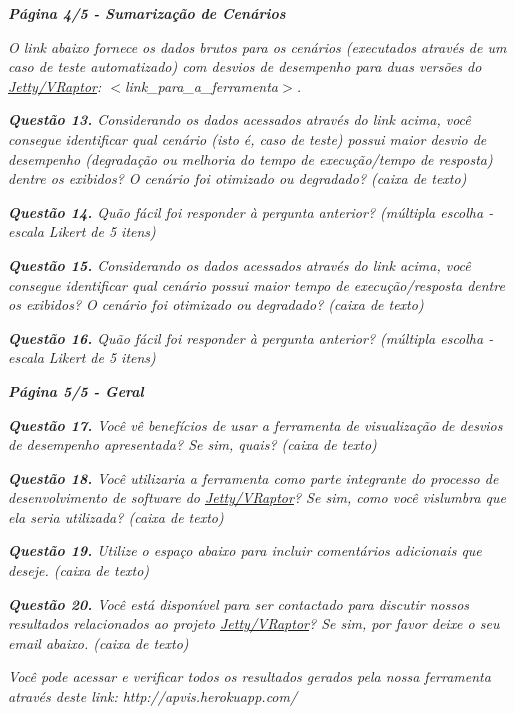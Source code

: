 \begin{framed}
	\noindent \textit{\textbf{Página 4/5 - Sumarização de Cenários}}
	\par
	\noindent \textit{O link abaixo fornece os dados brutos para os cenários (executados através de um caso de teste automatizado) com desvios de desempenho para duas versões do \underline{Jetty/VRaptor}: {\(<\)}link\_para\_a\_ferramenta{\(>\)}.}
	\par
	\noindent \textit{\textbf{Questão 13.} Considerando os dados acessados através do link acima, você consegue identificar qual cenário (isto é, caso de teste) possui maior desvio de desempenho (degradação ou melhoria do tempo de execução/tempo de resposta) dentre os exibidos? O cenário foi otimizado ou degradado? (caixa de texto)}
	\par
	\noindent \textit{\textbf{Questão 14.} Quão fácil foi responder à pergunta anterior? (múltipla escolha - escala Likert de 5 itens)}
	\par
	\noindent \textit{\textbf{Questão 15.} Considerando os dados acessados através do link acima, você consegue identificar qual cenário possui maior tempo de execução/resposta dentre os exibidos? O cenário foi otimizado ou degradado? (caixa de texto)}
	\par
	\noindent \textit{\textbf{Questão 16.} Quão fácil foi responder à pergunta anterior? (múltipla escolha - escala Likert de 5 itens)}
\end{framed}

\begin{framed}
	\noindent \textit{\textbf{Página 5/5 - Geral}}
	\par
	\noindent \textit{\textbf{Questão 17.} Você vê benefícios de usar a ferramenta de visualização de desvios de desempenho apresentada? Se sim, quais? (caixa de texto)}
	\par
	\noindent \textit{\textbf{Questão 18.} Você utilizaria a ferramenta como parte integrante do processo de desenvolvimento de software do \underline{Jetty/VRaptor}? Se sim, como você vislumbra que ela seria utilizada? (caixa de texto)}
	\par
	\noindent \textit{\textbf{Questão 19.} Utilize o espaço abaixo para incluir comentários adicionais que deseje. (caixa de texto)}
	\par
	\noindent \textit{\textbf{Questão 20.} Você está disponível para ser contactado para discutir nossos resultados relacionados ao projeto \underline{Jetty/VRaptor}? Se sim, por favor deixe o seu email abaixo. (caixa de texto)}

	\noindent \textit{Você pode acessar e verificar todos os resultados gerados pela nossa ferramenta através deste link: http://apvis.herokuapp.com/}
\end{framed}

